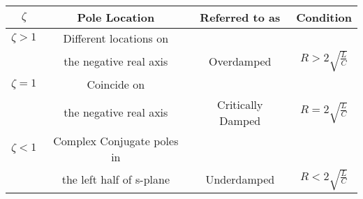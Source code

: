 \begin{tabular}{|c|c|c|c|}
\hline
    $\zeta$ & \textbf{Pole Location} & \textbf{Referred to as} & \textbf{Condition} \\
    \hline
    $\zeta > 1$ & Different locations on&&\\& the negative real axis & Overdamped & $R > 2\sqrt{\frac{L}{C}}$\\
    \hline
    $\zeta = 1$ & Coincide on&&\\& the negative real axis & Critically Damped & $R = 2\sqrt{\frac{L}{C}}$\\
    \hline
    $\zeta < 1$ & Complex Conjugate poles in&&\\& the left half of s-plane & Underdamped & $R < 2\sqrt{\frac{L}{C}}$\\
    \hline
\end{tabular}
